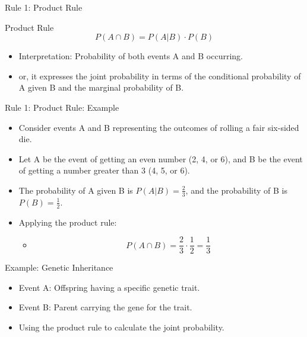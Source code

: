 \documentclass{beamer}
\begin{document}
\begin{frame}{Rule 1: Product Rule}
  \begin{block}{Product Rule}
    \[
      P(A \cap B) = P(A|B) \cdot P(B)
    \]
    \begin{itemize}
      \item Interpretation: Probability of both events A and B occurring.
      \item or, it expresses the joint probability in terms of the conditional probability of A given B and the marginal probability of B.
    \end{itemize}
  \end{block}
\end{frame}






\begin{frame}{Rule 1: Product Rule: Example}


  \begin{itemize}
      \item Consider events A and B representing the outcomes of rolling a fair six-sided die. 
      \item Let A be the event of getting an even number (2, 4, or 6), and B be the event of getting a number greater than 3 (4, 5, or 6). 
      \item The probability of A given B is \( P(A|B) = \frac{2}{3} \), and the probability of B is \( P(B) = \frac{1}{2} \).
      \item Applying the product rule:
      
        \begin{itemize}
			\item \[ P(A \cap B) = \frac{2}{3} \cdot \frac{1}{2} = \frac{1}{3} \]
		\end{itemize}
		
   \end{itemize}

\end{frame}


\begin{frame}{Example: Genetic Inheritance}
  \begin{itemize}
    \item Event A: Offspring having a specific genetic trait.
    \item Event B: Parent carrying the gene for the trait.
    \item Using the product rule to calculate the joint probability.
  \end{itemize}
\end{frame}
\end{document}
